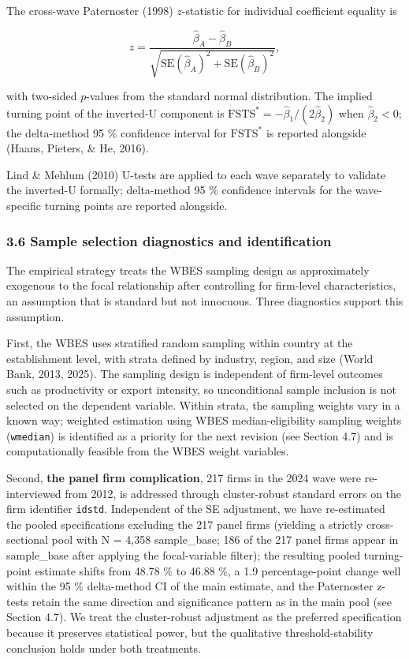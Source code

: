 \documentclass[12pt,a4paper]{article}
\begin{document}
The cross-wave Paternoster (1998) \(z\)-statistic for individual
coefficient equality is

\[
z = \frac{\hat\beta_A - \hat\beta_B}{\sqrt{\mathrm{SE}(\hat\beta_A)^2 + \mathrm{SE}(\hat\beta_B)^2}},
\]

with two-sided \(p\)-values from the standard normal distribution. The
implied turning point of the inverted-U component is
\(\mathrm{FSTS}^{*} = -\hat\beta_1/(2\hat\beta_2)\) when
\(\hat\beta_2 < 0\); the delta-method 95 \% confidence interval for
\(\mathrm{FSTS}^{*}\) is reported alongside (Haans, Pieters, \& He,
2016).

Lind \& Mehlum (2010) U-tests are applied to each wave separately to
validate the inverted-U formally; delta-method 95 \% confidence
intervals for the wave-specific turning points are reported alongside.

\hypertarget{36-sample-selection-diagnostics-and-identification}{%
\subsubsection{3.6 Sample selection diagnostics and
identification}\label{36-sample-selection-diagnostics-and-identification}}

The empirical strategy treats the WBES sampling design as approximately
exogenous to the focal relationship after controlling for firm-level
characteristics, an assumption that is standard but not innocuous. Three
diagnostics support this assumption.

First, the WBES uses stratified random sampling within country at the
establishment level, with strata defined by industry, region, and size
(World Bank, 2013, 2025). The sampling design is independent of
firm-level outcomes such as productivity or export intensity, so
unconditional sample inclusion is not selected on the dependent
variable. Within strata, the sampling weights vary in a known way;
weighted estimation using WBES median-eligibility sampling weights
(\texttt{wmedian}) is identified as a priority for the next revision
(see Section 4.7) and is computationally feasible from the WBES weight
variables.

Second, \textbf{the panel firm complication}, 217 firms in the 2024 wave
were re-interviewed from 2012, is addressed through cluster-robust
standard errors on the firm identifier \texttt{idstd}. Independent of
the SE adjustment, we have re-estimated the pooled specifications
excluding the 217 panel firms (yielding a strictly cross-sectional pool
with N = 4,358 sample\_base; 186 of the 217 panel firms appear in
sample\_base after applying the focal-variable filter); the resulting
pooled turning-point estimate shifts from 48.78 \% to 46.88 \%, a 1.9
percentage-point change well within the 95 \% delta-method CI of the
main estimate, and the Paternoster z-tests retain the same direction and
significance pattern as in the main pool (see Section 4.7). We treat the
cluster-robust adjustment as the preferred specification because it
preserves statistical power, but the qualitative threshold-stability
conclusion holds under both treatments.
\end{document}
